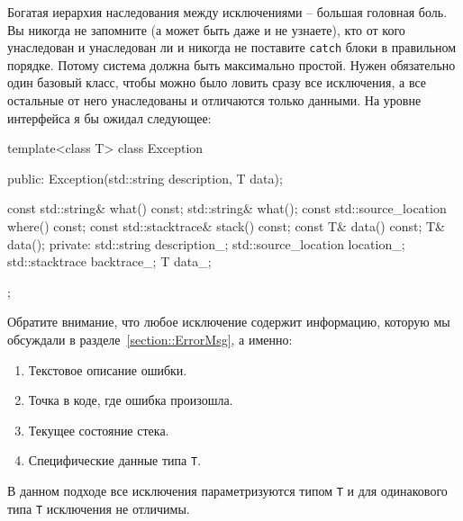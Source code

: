 Богатая иерархия наследования между исключениями -- большая головная боль.
Вы никогда не запомните (а может быть даже и не узнаете), кто от кого унаследован и унаследован ли и никогда не поставите \verb"catch" блоки в правильном порядке.
Потому система должна быть максимально простой.
Нужен обязательно один базовый класс, чтобы можно было ловить сразу все исключения, а все остальные от него унаследованы и отличаются только данными.
На уровне интерфейса я бы ожидал следующее:
\begin{cppcode}
template<class T>
class Exception {
public:
  Exception(std::string description, T data);

  const std::string& what() const;
  std::string& what();
  const std::source_location where() const;
  const std::stacktrace& stack() const;
  const T& data() const;
  T& data();
private:
  std::string description_;
  std::source_location location_;
  std::stacktrace backtrace_;
  T data_;
};
\end{cppcode}
Обратите внимание, что любое исключение содержит информацию, которую мы обсуждали в разделе~\ref{section::ErrorMsg}, а именно:
\begin{enumerate}
\item Текстовое описание ошибки.

\item Точка в коде, где ошибка произошла.

\item Текущее состояние стека.

\item Специфические данные типа \verb"T".
\end{enumerate}
В данном подходе все исключения параметризуются типом \verb"T" и для одинакового типа \verb"T" исключения не отличимы.

